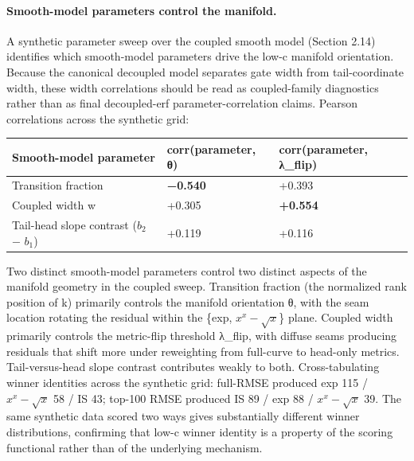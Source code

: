 \documentclass[11pt]{article}
\begin{document}
\paragraph{Smooth-model parameters control the manifold.} A synthetic parameter sweep over the coupled smooth model (Section 2.14) identifies which smooth-model parameters drive the low-c manifold orientation. Because the canonical decoupled model separates gate width from tail-coordinate width, these width correlations should be read as coupled-family diagnostics rather than as final decoupled-erf parameter-correlation claims. Pearson correlations across the synthetic grid:

\begin{center}
\small
\begin{tabular}{lll}
\toprule
Smooth-model parameter & corr(parameter, θ) & corr(parameter, λ\_flip) \\
\midrule
Transition fraction & \textbf{−0.540} & +0.393 \\
Coupled width w & +0.305 & \textbf{+0.554} \\
Tail-head slope contrast ($b_2$ − $b_1$) & +0.119 & +0.116 \\
\bottomrule
\end{tabular}
\end{center}

Two distinct smooth-model parameters control two distinct aspects of the manifold geometry in the coupled sweep. Transition fraction (the normalized rank position of k) primarily controls the manifold orientation θ, with the seam location rotating the residual within the \{exp, $x^x-\sqrt{x}$\} plane. Coupled width primarily controls the metric-flip threshold λ\_flip, with diffuse seams producing residuals that shift more under reweighting from full-curve to head-only metrics. Tail-versus-head slope contrast contributes weakly to both. Cross-tabulating winner identities across the synthetic grid: full-RMSE produced exp 115 / $x^x-\sqrt{x}$ 58 / IS 43; top-100 RMSE produced IS 89 / exp 88 / $x^x-\sqrt{x}$ 39. The same synthetic data scored two ways gives substantially different winner distributions, confirming that low-c winner identity is a property of the scoring functional rather than of the underlying mechanism.
\end{document}
